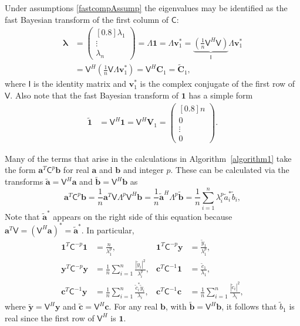 \documentclass{iitthesis}          %
\newcommand{\bm}[1]{\boldsymbol{#1}}
\newcommand{\vlambda}{{\bm{\lambda}}}
\newcommand{\va}{\bm{a}}
\newcommand{\vb}{\bm{b}}
\newcommand{\vc}{\bm{c}}
\newcommand{\vC}{\bm{C}}
\newcommand{\vv}{\bm{v}}
\newcommand{\vV}{\bm{V}}
\newcommand{\vy}{\bm{y}}
\newcommand{\vone}{\bm{1}}
\newcommand{\mC}{\mathsf{C}}
\newcommand{\mCInv}{{\mathsf{C}^{-1}}}
\newcommand{\mLambda}{\mathsf{\Lambda}}
\newcommand{\mV}{\mathsf{V}}
\def\abs#1{\ensuremath{\left \lvert #1 \right \rvert}}
\begin{document}
Under assumptions \eqref{fastcompAssump} the eigenvalues may be identified as the fast Bayesian transform of the first column of $\mC$:
\begin{align}
\nonumber
\vlambda 
& = \begin{pmatrix}[0.8]
\lambda_1 \\ \vdots \\ \lambda_n
\end{pmatrix} 
= \mLambda \vone = \mLambda \vv_1^* 
= \underbrace{\left( \frac 1n \mV^H  \mV \right) }_{\mathsf{I}} \mLambda \vv_1^* \\
&= \mV^H \left( \frac 1n \mV \mLambda \vv_1^* \right)
= \mV^H \vC_1 =  \widetilde{\vC}_1,
\label{eqn:fast_transform_to_eigvalues}
\end{align}
where $\mathsf{I}$ is the identity matrix and $\vv_1^*$ is the complex conjugate of the first row of $\mV$. 
Also note that the fast Bayesian transform of $\vone$ has a simple form
\begin{align*} 
\widetilde{\vone}
& = \mV^H \vone = \mV^H \vV_1 = \begin{pmatrix}[0.8] n \\ 0 \\ \vdots \\ 0 \end{pmatrix}.
\label{eqn:fast_transform_one}
\end{align*}

Many of the terms that arise in the calculations in  Algorithm~\ref{algorithm1} take the form $\va^T\mC^{p}\vb$ for real $\va$ and $\vb$ and integer $p$.  These can be calculated via the transforms $\widetilde{\va} = \mV^H \va$ and $\widetilde{\vb} = \mV^H \vb$ as 
\begin{equation*}
\va^T\mC^p\vb = \frac 1n \va^T \mV \mLambda^p \mV^H \vb
= \frac 1n \widetilde{\va}^H\mLambda^p \widetilde{\vb}
= \frac 1n \sum_{i=1}^n \lambda_i^p \widetilde{a}_i^* \widetilde{b}_i, 
\end{equation*}
Note that $\widetilde{\va}^*$ appears on the right side of this equation because $\va^T \mV = (\mV^H \va)^* = \widetilde{\va}^*$. In particular,
\begin{align*}
\vone^T\mC^{-p}\vone & = \frac{n}{\lambda_1^p},
&
\vone^T\mC^{-p}\vy &= \frac{\widetilde{y}_1}{\lambda_1^p},
\\
\vy^T\mC^{-p} \vy &= \frac 1n \sum_{i=1}^n \frac{\abs{\widetilde{y}_i}^2}{\lambda_i^p},
&
\vc^T\mCInv \vone &= \frac{\widetilde{c}_1}{\lambda_1},\\
\vc^T\mCInv \vy &= \frac 1n \sum_{i=1}^n \frac{\widetilde{c}_i^* \widetilde{y}_i}{\lambda_i}, & 
\vc^T\mCInv \vc &= \frac 1n \sum_{i=1}^n \frac{\abs{\widetilde{c}_i}^2}{\lambda_i},
\end{align*}
where $\widetilde{\vy} = \mV^H \vy$ and 
$\widetilde{\vc} = \mV^H \vc$.  For any real $\vb$, with $\widetilde{\vb} = \mV^H\vb$, it follows that $\widetilde{b}_1$ is real since the first row of $\mV^H$ is $\vone$.
\end{document}
